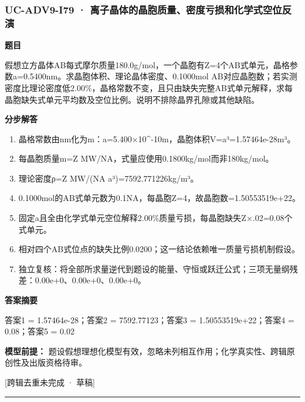 \documentclass[UTF8,11pt,a4paper]{ctexart}
\begin{document}
\subsubsection*{UC-ADV9-I79 · 离子晶体的晶胞质量、密度亏损和化学式空位反演}
\noindent\textbf{题目}\par
假想立方晶体AB每式摩尔质量180.0g/mol，一个晶胞有Z=4个AB式单元，晶格参数a=0.5400nm。求晶胞体积、理论晶体密度、0.1000mol AB对应晶胞数；若实测密度比理论密度低2.00\%，晶格常数不变，且只由缺失完整AB式单元解释，求每晶胞缺失式单元平均数及空位比例。说明不排除晶界孔隙或其他缺陷。\par
\medskip\noindent\textbf{分步解答}
\begin{enumerate}
\item 晶格常数由nm化为m：a=5.400×10\textasciicircum{}-10m，晶胞体积V=a³=1.57464e-28m³。
\item 每晶胞质量m=Z MW/NA，式量应使用0.1800kg/mol而非180kg/mol。
\item 理论密度ρ=Z MW/(NA a³)=7592.771226kg/m³。
\item 0.1000mol的AB式单元数为0.1NA，每晶胞Z=4，故晶胞数=1.50553519e+22。
\item 固定a且全由化学式单元空位解释2.00\%质量亏损，每晶胞缺失Z×.02=0.08个式单元。
\item 相对四个AB式位点的缺失比例0.0200；这一结论依赖唯一质量亏损机制假设。
\item 独立复核：将全部所求量逆代到题设的能量、守恒或跃迁公式；三项无量纲残差：0.00e+0、0.00e+0、0.00e+0。
\end{enumerate}
\noindent\textbf{答案摘要}\par
答案1 = 1.57464e-28；答案2 = 7592.77123；答案3 = 1.50553519e+22；答案4 = 0.08；答案5 = 0.02\par
\noindent\textbf{模型前提：}
题设假想理想化模型有效，忽略未列相互作用；化学真实性、跨辑原创性及出版资格待审。\par
\noindent\textcolor{red!65!black}{[跨辑去重未完成 · 草稿]} \par
\medskip\hrule\medskip
{}
\end{document}
